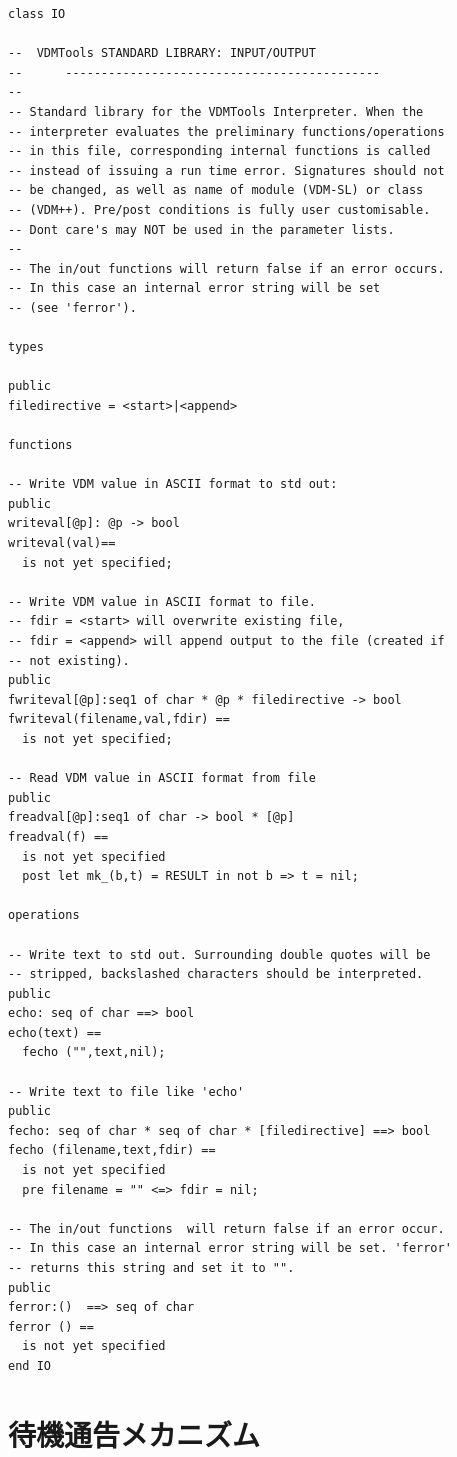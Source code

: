 \documentclass[\pformat,12pt]{jreport}
\begin{document}
\begin{lstlisting}
class IO

--  VDMTools STANDARD LIBRARY: INPUT/OUTPUT
--      --------------------------------------------
-- 
-- Standard library for the VDMTools Interpreter. When the 
-- interpreter evaluates the preliminary functions/operations 
-- in this file, corresponding internal functions is called 
-- instead of issuing a run time error. Signatures should not 
-- be changed, as well as name of module (VDM-SL) or class 
-- (VDM++). Pre/post conditions is fully user customisable. 
-- Dont care's may NOT be used in the parameter lists.
--
-- The in/out functions will return false if an error occurs. 
-- In this case an internal error string will be set 
-- (see 'ferror').

types
 
public
filedirective = <start>|<append> 

functions

-- Write VDM value in ASCII format to std out:
public
writeval[@p]: @p -> bool
writeval(val)==
  is not yet specified;

-- Write VDM value in ASCII format to file.
-- fdir = <start> will overwrite existing file,
-- fdir = <append> will append output to the file (created if
-- not existing).
public
fwriteval[@p]:seq1 of char * @p * filedirective -> bool
fwriteval(filename,val,fdir) ==
  is not yet specified;

-- Read VDM value in ASCII format from file
public
freadval[@p]:seq1 of char -> bool * [@p]
freadval(f) ==
  is not yet specified
  post let mk_(b,t) = RESULT in not b => t = nil;

operations

-- Write text to std out. Surrounding double quotes will be 
-- stripped, backslashed characters should be interpreted.
public
echo: seq of char ==> bool
echo(text) ==
  fecho ("",text,nil);

-- Write text to file like 'echo'
public
fecho: seq of char * seq of char * [filedirective] ==> bool
fecho (filename,text,fdir) ==
  is not yet specified
  pre filename = "" <=> fdir = nil;

-- The in/out functions  will return false if an error occur. 
-- In this case an internal error string will be set. 'ferror' 
-- returns this string and set it to "".
public
ferror:()  ==> seq of char
ferror () ==
  is not yet specified
end IO
\end{lstlisting}

\section{待機通告メカニズム} \label{app:waitnotify}
\end{document}
